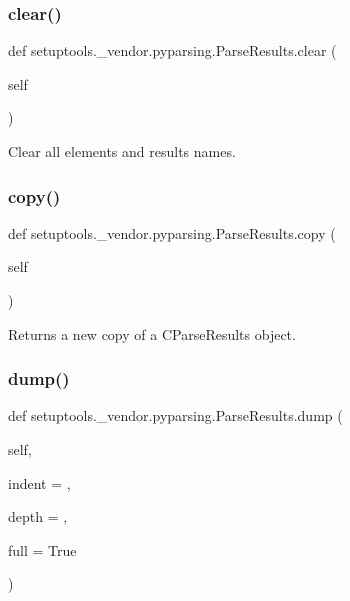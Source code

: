 \subsubsection{\texorpdfstring{clear()}{clear()}}
{\footnotesize\ttfamily def setuptools.\+\_\+vendor.\+pyparsing.\+Parse\+Results.\+clear (\begin{DoxyParamCaption}\item[{}]{self }\end{DoxyParamCaption})}

\begin{DoxyVerb}Clear all elements and results names.
\end{DoxyVerb}
 \mbox{\label{classsetuptools_1_1__vendor_1_1pyparsing_1_1ParseResults_a5783f341eb651c8c6e2f3b0713afe18b}} 
\subsubsection{\texorpdfstring{copy()}{copy()}}
{\footnotesize\ttfamily def setuptools.\+\_\+vendor.\+pyparsing.\+Parse\+Results.\+copy (\begin{DoxyParamCaption}\item[{}]{self }\end{DoxyParamCaption})}

\begin{DoxyVerb}Returns a new copy of a C{ParseResults} object.
\end{DoxyVerb}
 \mbox{\label{classsetuptools_1_1__vendor_1_1pyparsing_1_1ParseResults_a1a4a3dd9ab26677a709fdcbb2289da04}} 
\subsubsection{\texorpdfstring{dump()}{dump()}}
{\footnotesize\ttfamily def setuptools.\+\_\+vendor.\+pyparsing.\+Parse\+Results.\+dump (\begin{DoxyParamCaption}\item[{}]{self,  }\item[{}]{indent = {\ttfamily \textquotesingle{}\textquotesingle{}},  }\item[{}]{depth = {},  }\item[{}]{full = {\ttfamily True} }\end{DoxyParamCaption})}

